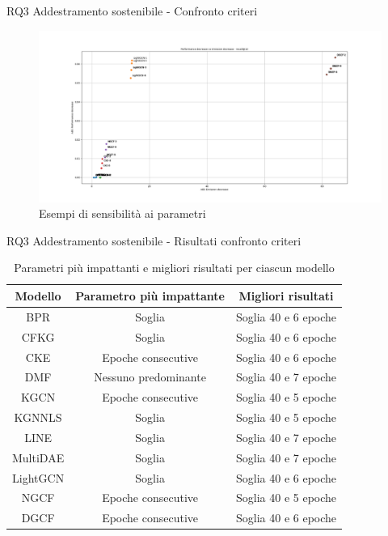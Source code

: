 \begin{frame}{RQ3 Addestramento sostenibile - Confronto criteri}
    \begin{figure}[H]
       \centering
       \includegraphics[scale=0.25]{images/sensibility_recall@10.png}
       \caption{Esempi di sensibilità ai parametri}
    \end{figure}
\end{frame}



\begin{frame}{RQ3 Addestramento sostenibile - Risultati confronto criteri}
\begin{table}[H]
    \scriptsize
    \centering
    \begin{tabular}{|c|c|c|}
        \hline
        \textbf{Modello} & \textbf{Parametro più impattante} & \textbf{Migliori risultati} \\
        \hline
        BPR & Soglia & Soglia 40 e 6 epoche \\
        \hline
        CFKG & Soglia & Soglia 40 e 6 epoche \\
        \hline
        CKE & Epoche consecutive & Soglia 40 e 6 epoche \\
        \hline
        DMF & Nessuno predominante & Soglia 40 e 7 epoche \\
        \hline
        KGCN & Epoche consecutive & Soglia 40 e 5 epoche \\
        \hline
        KGNNLS & Soglia & Soglia 40 e 5 epoche \\
        \hline
        LINE & Soglia & Soglia 40 e 7 epoche \\
        \hline
        MultiDAE & Soglia & Soglia 40 e 7 epoche \\
        \hline
        LightGCN & Soglia & Soglia 40 e 6 epoche \\
        \hline
        NGCF & Epoche consecutive & Soglia 40 e 5 epoche \\
        \hline
        DGCF & Epoche consecutive & Soglia 40 e 6 epoche \\
        \hline
    \end{tabular}
    \caption{Parametri più impattanti e migliori risultati per ciascun modello}
\end{table}
\end{frame}


